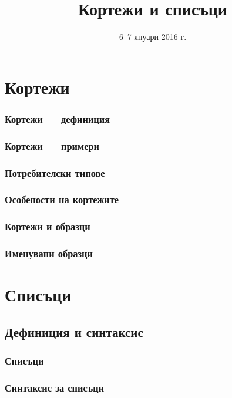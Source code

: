 \documentclass{beamer}
\title{Кортежи и списъци}
\date{6--7 януари 2016 г.}
\begin{document}
\begin{frame}
  \titlepage
\end{frame}


\section{Кортежи}

\begin{frame}
  \frametitle{Кортежи --- дефиниция}
  
\end{frame}

\begin{frame}
  \frametitle{Кортежи --- примери}
  
\end{frame}

\begin{frame}
  \frametitle{Потребителски типове}
  
\end{frame}

\begin{frame}
  \frametitle{Особености на кортежите}
  
\end{frame}

\begin{frame}
  \frametitle{Кортежи и образци}
  
\end{frame}

\begin{frame}
  \frametitle{Именувани образци}
  
\end{frame}

\section{Списъци}

\subsection{Дефиниция и синтаксис}


\begin{frame}
  \frametitle{Списъци}
  
\end{frame}

\begin{frame}
  \frametitle{Синтаксис за списъци}
  
\end{frame}
\end{document}
